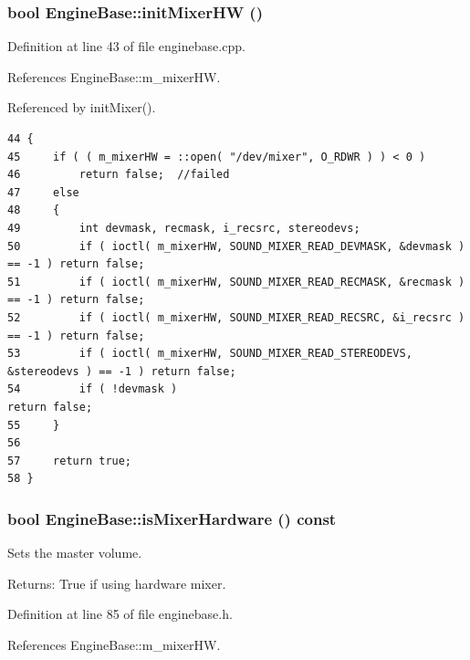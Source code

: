 \subsubsection{\setlength{\rightskip}{0pt plus 5cm}bool Engine\-Base::init\-Mixer\-HW ()\hspace{0.3cm}{\tt  [protected, inherited]}}\label{classEngineBase_EngineBaseb1}




Definition at line 43 of file enginebase.cpp.

References Engine\-Base::m\_\-mixer\-HW.

Referenced by init\-Mixer().



\footnotesize\begin{verbatim}44 {
45     if ( ( m_mixerHW = ::open( "/dev/mixer", O_RDWR ) ) < 0 )
46         return false;  //failed
47     else
48     {
49         int devmask, recmask, i_recsrc, stereodevs;
50         if ( ioctl( m_mixerHW, SOUND_MIXER_READ_DEVMASK, &devmask )       == -1 ) return false;
51         if ( ioctl( m_mixerHW, SOUND_MIXER_READ_RECMASK, &recmask )       == -1 ) return false;
52         if ( ioctl( m_mixerHW, SOUND_MIXER_READ_RECSRC, &i_recsrc )       == -1 ) return false;
53         if ( ioctl( m_mixerHW, SOUND_MIXER_READ_STEREODEVS, &stereodevs ) == -1 ) return false;
54         if ( !devmask )                                                           return false;
55     }
56 
57     return true;
58 }
\end{verbatim}\normalsize 
{}
\subsubsection{\setlength{\rightskip}{0pt plus 5cm}bool Engine\-Base::is\-Mixer\-Hardware () const\hspace{0.3cm}{\tt  [inline, inherited]}}\label{classEngineBase_EngineBasea11}


Sets the master volume. \begin{Desc}
\item[Returns:]True if using hardware mixer. \end{Desc}


Definition at line 85 of file enginebase.h.

References Engine\-Base::m\_\-mixer\-HW.



